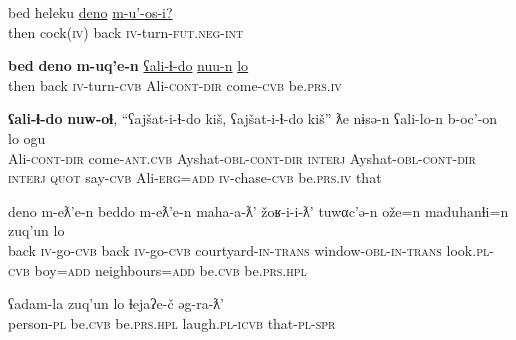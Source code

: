 \documentclass[output=paper]{LSP/langsci}
\begin{document}
\begin{exe}
\gll  bed	ħeleku	\underline{deno}	\underline{m-u'-os-i?}\\
then	cock(\textsc{iv})	back	\textsc{iv}-turn-\textsc{fut.neg-int} \\
\glt {}
\end{exe}

\begin{exe}
\gll  \textbf{bed} 	\textbf{deno}		\textbf{m-uq'e-n}		\underline{ʕali-ɬ-do}			\underline{nuu-n}			\underline{lo}\\
then	back		\textsc{iv}-turn-\textsc{cvb}	Ali-\textsc{cont-dir}	come-\textsc{cvb}	be.\textsc{prs.iv} \\
\glt {}
\end{exe}

\begin{exe}
\gll  \textbf{ʕali-ɬ-do} \textbf{nuw-oɬ}, “ʕajšat-i-ɬ-do kiš, ʕajšat-i-ɬ-do kiš” ƛe nɨsə-n ʕali-lo-n b-oc’-on lo ogu \\
Ali-\textsc{cont-dir} come-\textsc{ant.cvb}  Ayshat-\textsc{obl-cont-dir} \textsc{interj} Ayshat-\textsc{obl-cont-dir} \textsc{interj} \textsc{quot} say-\textsc{cvb} Ali-\textsc{erg=add} \textsc{iv}-chase-\textsc{cvb} be.\textsc{prs.iv} that  \\
\glt {}
\end{exe}

\begin{exe}
\gll  deno m-eƛ’e-n  beddo m-eƛ’e-n maha-a-ƛ’ žoʁ-i-i-ƛ’ tuwαc’ə-n ože=n maduhanɬi=n zuq’un lo\\
back \textsc{iv}-go-\textsc{cvb} back \textsc{iv}-go-\textsc{cvb} courtyard-\textsc{in-trans} window-\textsc{obl-in-trans} look.\textsc{pl-cvb} boy=\textsc{add} neighbours=\textsc{add} be.\textsc{cvb} be.\textsc{prs.hpl}  \\
\glt {}
\end{exe}

\begin{exe}
\gll  ʕadam-la zuq’un lo ɬejaʔe-č əg-ra-ƛ’\\
person-\textsc{pl} be.\textsc{cvb} be.\textsc{prs.hpl} laugh.\textsc{pl-icvb} that-\textsc{pl-spr}  \\
\glt {}
\end{exe}
\end{document}
